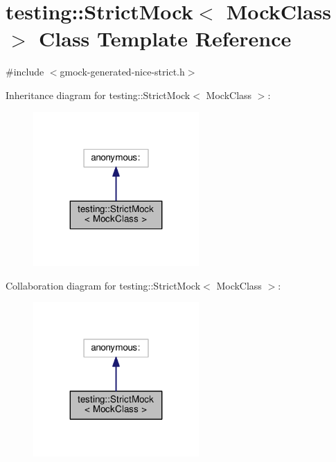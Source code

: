 \hypertarget{classtesting_1_1StrictMock}{}\section{testing\+:\+:Strict\+Mock$<$ Mock\+Class $>$ Class Template Reference}
\label{classtesting_1_1StrictMock}


{\ttfamily \#include $<$gmock-\/generated-\/nice-\/strict.\+h$>$}



Inheritance diagram for testing\+:\+:Strict\+Mock$<$ Mock\+Class $>$\+:\nopagebreak
\begin{figure}[H]
\begin{center}
\leavevmode
\includegraphics[width=179pt]{classtesting_1_1StrictMock__inherit__graph}
\end{center}
\end{figure}


Collaboration diagram for testing\+:\+:Strict\+Mock$<$ Mock\+Class $>$\+:\nopagebreak
\begin{figure}[H]
\begin{center}
\leavevmode
\includegraphics[width=179pt]{classtesting_1_1StrictMock__coll__graph}
\end{center}
\end{figure}
